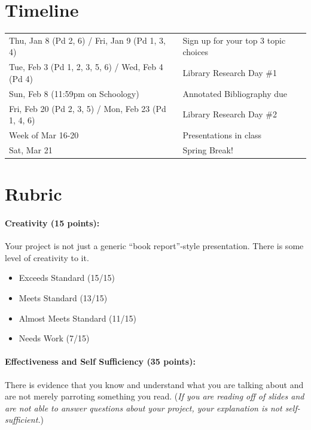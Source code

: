 \documentclass[11pt]{exam}
\begin{document}
\section*{Timeline}

\begin{tabular}{ll}
  Thu, Jan 8 (Pd 2, 6) / Fri, Jan 9 (Pd 1, 3, 4) & 
  Sign up for your top 3 topic choices
  \\[0.5em]
  Tue, Feb 3 (Pd 1, 2, 3, 5, 6) / Wed, Feb 4 (Pd 4) & 
  Library Research Day \#1
  \\[0.5em]
  Sun, Feb 8 (11:59pm on Schoology) & 
  Annotated Bibliography due
  \\[0.5em]
  Fri, Feb 20 (Pd 2, 3, 5) / Mon, Feb 23 (Pd 1, 4, 6)& 
  Library Research Day \#2
  \\[0.5em]
  Week of Mar 16-20 & 
  Presentations in class
  \\[0.5em]
  Sat, Mar 21 &
  Spring Break!
\end{tabular}


\pagebreak



\section*{Rubric}

\paragraph{Creativity (15 points):} 
  Your project is not just a generic ``book report''-style presentation.  There is some level of creativity to it.

\begin{itemize}
  \item Exceeds Standard (15/15)
  \item Meets Standard (13/15)
  \item Almost Meets Standard (11/15)
  \item Needs Work (7/15)
  
\end{itemize}




\paragraph{Effectiveness and Self Sufficiency (35 points):} 
  There is evidence that you know and understand what you are talking about and are not merely parroting something you read.  (\emph{If you are reading off of slides and are not able to answer questions about your project, your explanation is not self-sufficient.})
\end{document}
